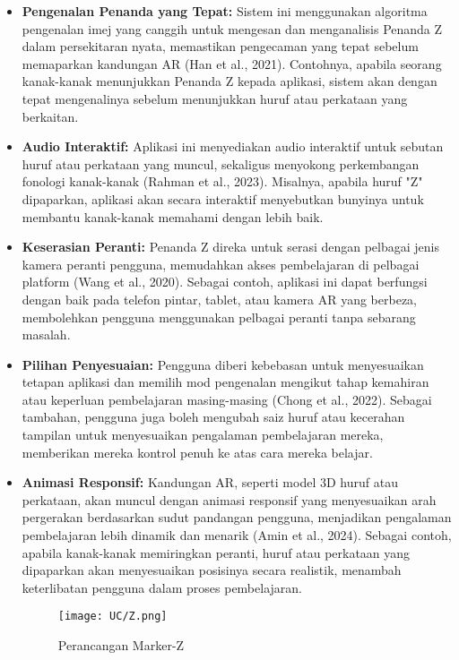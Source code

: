 \begin{itemize}
\begin{itemize}
\begin{itemize}
\begin{itemize}
\begin{itemize}
\begin{itemize}
\begin{itemize}
\begin{itemize}
\item \textbf{Pengenalan Penanda yang Tepat:} Sistem ini menggunakan algoritma pengenalan imej yang canggih untuk mengesan dan menganalisis Penanda Z dalam persekitaran nyata, memastikan pengecaman yang tepat sebelum memaparkan kandungan AR (Han et al., 2021). Contohnya, apabila seorang kanak-kanak menunjukkan Penanda Z kepada aplikasi, sistem akan dengan tepat mengenalinya sebelum menunjukkan huruf atau perkataan yang berkaitan.  \\
\item \textbf{Audio Interaktif:} Aplikasi ini menyediakan audio interaktif untuk sebutan huruf atau perkataan yang muncul, sekaligus menyokong perkembangan fonologi kanak-kanak (Rahman et al., 2023). Misalnya, apabila huruf "Z" dipaparkan, aplikasi akan secara interaktif menyebutkan bunyinya untuk membantu kanak-kanak memahami dengan lebih baik.  \\
\item \textbf{Keserasian Peranti:} Penanda Z direka untuk serasi dengan pelbagai jenis kamera peranti pengguna, memudahkan akses pembelajaran di pelbagai platform (Wang et al., 2020). Sebagai contoh, aplikasi ini dapat berfungsi dengan baik pada telefon pintar, tablet, atau kamera AR yang berbeza, membolehkan pengguna menggunakan pelbagai peranti tanpa sebarang masalah.  \\
\item \textbf{Pilihan Penyesuaian:} Pengguna diberi kebebasan untuk menyesuaikan tetapan aplikasi dan memilih mod pengenalan mengikut tahap kemahiran atau keperluan pembelajaran masing-masing (Chong et al., 2022). Sebagai tambahan, pengguna juga boleh mengubah saiz huruf atau kecerahan tampilan untuk menyesuaikan pengalaman pembelajaran mereka, memberikan mereka kontrol penuh ke atas cara mereka belajar.  \\
\item \textbf{Animasi Responsif:} Kandungan AR, seperti model 3D huruf atau perkataan, akan muncul dengan animasi responsif yang menyesuaikan arah pergerakan berdasarkan sudut pandangan pengguna, menjadikan pengalaman pembelajaran lebih dinamik dan menarik (Amin et al., 2024). Sebagai contoh, apabila kanak-kanak memiringkan peranti, huruf atau perkataan yang dipaparkan akan menyesuaikan posisinya secara realistik, menambah keterlibatan pengguna dalam proses pembelajaran.  
\clearpage

\begin{figure}[h]
     \centering
     \texttt{[image: UC/Z.png]}
     \caption{Perancangan Marker-Z}
     \label{fig:enterZ}
 \end{figure}


\end{itemize}
\end{itemize}
\end{itemize}
\end{itemize}
\end{itemize}
\end{itemize}
\end{itemize}
\end{itemize}
